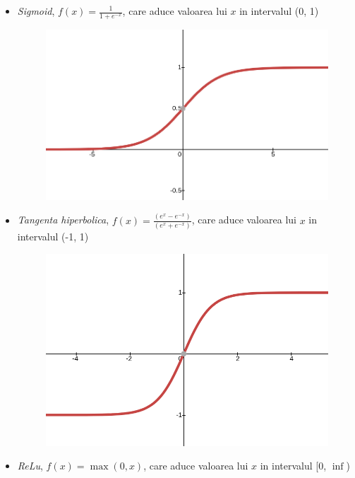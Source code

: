 \documentclass[a4paper,12pt]{book}
\begin{document}
			\begin{itemize}
				\item \textit{Sigmoid},  $f(x) = \frac{1}{1+e^{-x}}$, care aduce valoarea lui $x$ in intervalul (0, 1)
				\begin{figure}[h]
					\centering
					\includegraphics[scale=0.20]{sigmoid}
					\label{fig:nns}
				\end{figure}
				\newline	
				\item \textit{Tangenta hiperbolica},  $f(x) = \frac{(e^x-e^{-x})}{(e^x+e^{-x})}$, care aduce valoarea lui $x$ in intervalul (-1, 1)
				\begin{figure}[!h]
					\centering
					\includegraphics[scale=0.20]{tanh}
					\label{fig:nns}
				\end{figure}	
				\item \textit{ReLu}, $f(x) = \max(0, x)$, care aduce valoarea lui $x$ in intervalul  [0, $\inf$)
				\begin{figure}[!h]

\end{figure}
\end{itemize}
\end{document}
